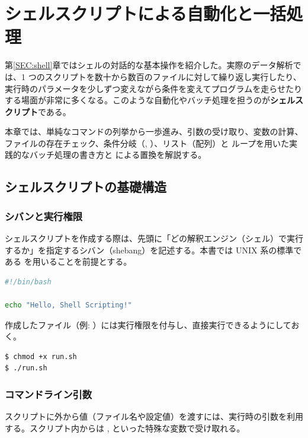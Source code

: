 \chapter{シェルスクリプトによる自動化と一括処理}
\label{app:shell_scripting}

第\ref{SEC:shell}章ではシェルの対話的な基本操作を紹介した。実際のデータ解析では、1 つのスクリプトを数十から数百のファイルに対して繰り返し実行したり、実行時のパラメータを少しずつ変えながら条件を変えてプログラムを走らせたりする場面が非常に多くなる。このような自動化やバッチ処理を担うのが\textbf{シェルスクリプト}である。

本章では、単純なコマンドの列挙から一歩進み、引数の受け取り、変数の計算、ファイルの存在チェック、条件分岐（, ）、リスト（配列）と  ループを用いた実践的なバッチ処理の書き方と  による置換を解説する。

\section{シェルスクリプトの基礎構造}

\subsection{シバンと実行権限}

シェルスクリプトを作成する際は、先頭に「どの解釈エンジン（シェル）で実行するか」を指定するシバン（shebang）を記述する。本書では UNIX 系の標準である  を用いることを前提とする。

\begin{lstlisting}[language=bash]
#!/bin/bash

echo "Hello, Shell Scripting!"
\end{lstlisting}

作成したファイル（例: ）には実行権限を付与し、直接実行できるようにしておく。

\begin{lstlisting}[numbers=none, xleftmargin=2\zw]
$ chmod +x run.sh
$ ./run.sh
\end{lstlisting}

\subsection{コマンドライン引数}

スクリプトに外から値（ファイル名や設定値）を渡すには、実行時の引数を利用する。スクリプト内からは ,  といった特殊な変数で受け取れる。

